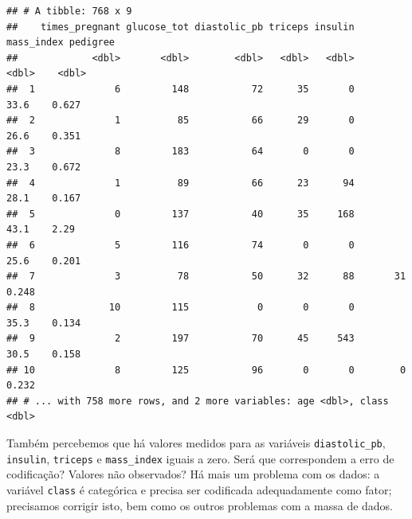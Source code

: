 \documentclass[
]{book}
\newenvironment{Shaded}{\begin{snugshade}}{\end{snugshade}}
\newcommand{\CommentTok}[1]{\textcolor[rgb]{0.56,0.35,0.01}{\textit{#1}}}
\newcommand{\KeywordTok}[1]{\textcolor[rgb]{0.13,0.29,0.53}{\textbf{#1}}}
\newcommand{\NormalTok}[1]{#1}
\newcommand{\OperatorTok}[1]{\textcolor[rgb]{0.81,0.36,0.00}{\textbf{#1}}}
\newcommand{\StringTok}[1]{\textcolor[rgb]{0.31,0.60,0.02}{#1}}
\theoremstyle{definition}
\theoremstyle{definition}
\theoremstyle{definition}
\theoremstyle{remark}
\begin{document}
\begin{verbatim}
## # A tibble: 768 x 9
##    times_pregnant glucose_tot diastolic_pb triceps insulin mass_index pedigree
##             <dbl>       <dbl>        <dbl>   <dbl>   <dbl>      <dbl>    <dbl>
##  1              6         148           72      35       0       33.6    0.627
##  2              1          85           66      29       0       26.6    0.351
##  3              8         183           64       0       0       23.3    0.672
##  4              1          89           66      23      94       28.1    0.167
##  5              0         137           40      35     168       43.1    2.29 
##  6              5         116           74       0       0       25.6    0.201
##  7              3          78           50      32      88       31      0.248
##  8             10         115            0       0       0       35.3    0.134
##  9              2         197           70      45     543       30.5    0.158
## 10              8         125           96       0       0        0      0.232
## # ... with 758 more rows, and 2 more variables: age <dbl>, class <dbl>
\end{verbatim}

Também percebemos que há valores medidos para as variáveis \texttt{diastolic\_pb}, \texttt{insulin}, \texttt{triceps} e \texttt{mass\_index} iguais a zero. Será que correspondem a erro de codificação? Valores não observados? Há mais um problema com os dados: a variável \texttt{class} é categórica e precisa ser codificada adequadamente como fator; precisamos corrigir isto, bem como os outros problemas com a massa de dados.

\begin{Shaded}
\end{Shaded}
\end{document}
